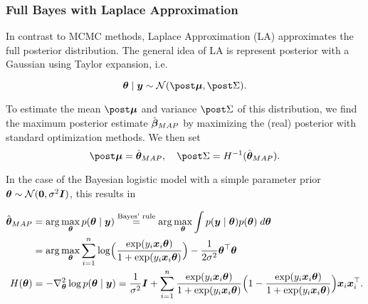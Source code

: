 
\subsubsection*{Full Bayes with Laplace Approximation}

In contrast to MCMC methods, Laplace Approximation (LA) approximates the full posterior distribution. The general idea of LA is represent posterior with a Gaussian using Taylor expansion, i.e.

\begin{equation}
    \btheta \mid \by \sim \Ncal(\mupo, \Sdpo).
\end{equation}

To estimate the mean $\mupo$ and variance $\Sdpo$ of this distribution, we find the maximum posterior estimate $\hat{\bm{\beta}}_{MAP}$ by maximizing the (real) posterior with standard optimization methods. We then set
\begin{equation*}
    \mupo = \hbtheta_{MAP}, \quad \Sdpo = H^{-1}(\hbtheta_{MAP}).
\end{equation*}

In the case of the Bayesian logistic model with a simple parameter prior $\bm{\theta} \sim \mathcal{N}(\bm{0}, \sigma^2 \bm{I})$, this results in

\begin{equation*}
    \begin{aligned}
        \hat{\bm{\theta}}_{MAP} &= \arg \max_{\bm{\theta}} p(\bm{\theta} \mid \bm{y})
            \overset{\text{Bayes' rule}}{=} \arg \max_{\bm{\theta}} \int p(\bm{y} \mid \bm{\theta}) p(\bm{\theta}) \; d\bm{\theta}  \\
            &= \arg \max_{\bm{\theta}} \sum_{i = 1}^n \log \Bigl(\frac{\exp(y_i \bm{x}_i\bm{\theta})}{1 + \exp(y_i \bm{x}_i\bm{\theta})}\Bigr) - \frac{1}{2 \sigma^2} \bm{\theta}^\top \bm{\theta} \\
        H(\bm{\theta}) &= - \nabla^2_{\bm{\theta}}  \log p (\bm{\theta} \mid \bm{y}) = \frac{1}{\sigma^2} \bm{I} + \sum_{i = 1}^n 
            \frac{\exp(y_i \bm{x}_i\bm{\theta})}{1 + \exp(y_i \bm{x}_i\bm{\theta})}
            \Bigl( 1 - \frac{\exp(y_i \bm{x}_i\bm{\theta})}{1 + \exp(y_i \bm{x}_i\bm{\theta})}\Bigr)
            \bm{x}_i \bm{x}_i^\top.
    \end{aligned}
\end{equation*}

